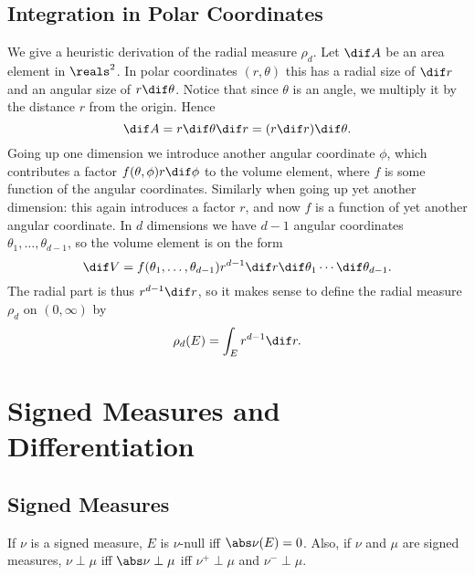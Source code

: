 \documentclass[article, a4paper, 11pt, oneside]{memoir}
\numberwithin{equation}{chapter}
\theoremstyle{nonumberplain}
\begin{document}
\addtocounter{section}{5}
\section{Integration in Polar Coordinates}

\begin{remark}
	We give a heuristic derivation of the radial measure $\rho_d$. Let $\dif A$ be an area element in $\reals^2$. In polar coordinates $(r,\theta)$ this has a radial size of $\dif r$ and an angular size of $r \dif\theta$. Notice that since $\theta$ is an angle, we multiply it by the distance $r$ from the origin. Hence
	\begin{equation*}
		\dif A
			= r \dif\theta \dif r
			= (r \dif r) \dif\theta.
	\end{equation*}
	Going up one dimension we introduce another angular coordinate $\phi$, which contributes a factor $f(\theta,\phi) r \dif\phi$ to the volume element, where $f$ is some function of the angular coordinates. Similarly when going up yet another dimension: this again introduces a factor $r$, and now $f$ is a function of yet another angular coordinate. In $d$ dimensions we have $d-1$ angular coordinates $\theta_1, \ldots, \theta_{d-1}$, so the volume element is on the form
	\begin{equation*}
		\dif V
			= f(\theta_1, \ldots, \theta_{d-1}) r^{d-1} \dif r \dif\theta_1 \cdots \dif\theta_{d-1}.
	\end{equation*}
	The radial part is thus $r^{d-1} \dif r$, so it makes sense to define the radial measure $\rho_d$ on $(0,\infty)$ by
	\begin{equation*}
		\rho_d(E)
			= \int_E r^{d-1} \dif r.
	\end{equation*}
\end{remark}


\chapter{Signed Measures and Differentiation}

\section{Signed Measures}

\begin{exerciseframed*}[2]
	If $\nu$ is a signed measure, $E$ is $\nu$-null iff $\abs\nu(E) = 0$. Also, if $\nu$ and $\mu$ are signed measures, $\nu \perp \mu$ iff $\abs\nu \perp \mu$ iff $\nu^+ \perp \mu$ and $\nu^- \perp \mu$.
\end{exerciseframed*}
\end{document}

